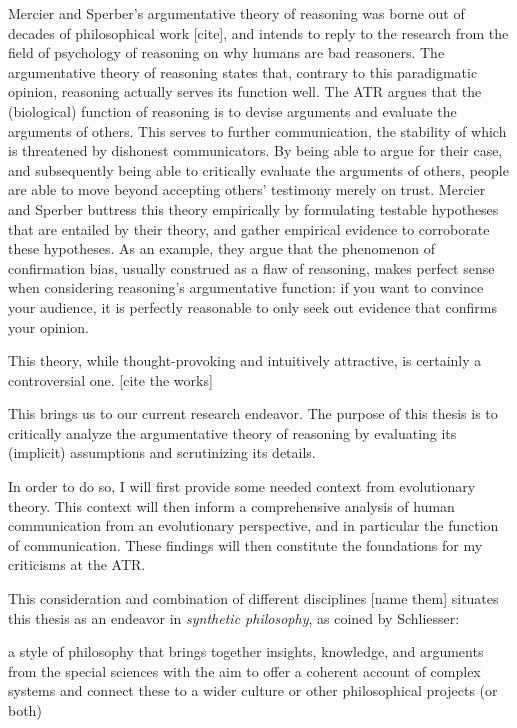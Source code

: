 Mercier and Sperber's argumentative theory of reasoning was borne out of decades of philosophical work [cite], and intends to reply to the research from the field of psychology of reasoning on why humans are bad reasoners.
The argumentative theory of reasoning states that, contrary to this paradigmatic opinion, reasoning actually serves its function well. The ATR argues that the (biological) function of reasoning is to devise arguments and evaluate the arguments of others. This serves to further communication, the stability of which is threatened by dishonest communicators. By being able to argue for their case, and subsequently being able to critically evaluate the arguments of others, people are able to move beyond accepting others' testimony merely on trust.
Mercier and Sperber buttress this theory empirically by formulating testable hypotheses that are entailed by their theory, and gather empirical evidence to corroborate these hypotheses. As an example, they argue that the phenomenon of confirmation bias, usually construed as a flaw of reasoning, makes perfect sense when considering reasoning's argumentative function: if you want to convince your audience, it is perfectly reasonable to only seek out evidence that confirms your opinion.

This theory, while thought-provoking and intuitively attractive, is certainly a controversial one. [cite the works]

This brings us to our current research endeavor.
The purpose of this thesis is to critically analyze the argumentative theory of reasoning by evaluating its (implicit) assumptions and scrutinizing its details.

In order to do so, I will first provide some needed context from evolutionary theory. This context will then inform a comprehensive analysis of human communication from an evolutionary perspective, and in particular the function of communication. These findings will then constitute the foundations for my criticisms at the ATR.

This consideration and combination of different disciplines [name them] situates this thesis as an endeavor in \emph{synthetic philosophy}, as coined by Schliesser:
\begin{quoting}
    a style of philosophy that brings together insights, knowledge, and arguments from the special sciences with the aim to offer a coherent account of complex systems and connect these to a wider culture or other philosophical projects (or both) 
\end{quoting}

